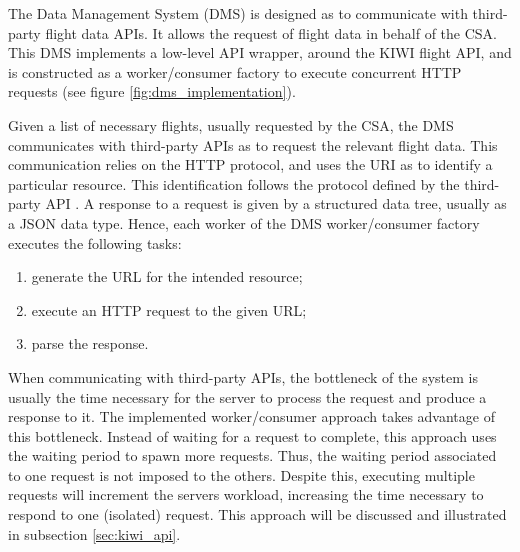 The Data Management System (DMS) is designed as to communicate with third-party flight data APIs. It allows the request of flight data in behalf of the CSA. This DMS implements a low-level API wrapper, around the KIWI flight API, and is constructed as a worker/consumer factory to execute concurrent HTTP requests (see figure \ref{fig:dms_implementation}). 


Given a list of necessary flights, usually requested by the CSA, the DMS communicates with third-party APIs as to request the relevant flight data. This communication relies on the HTTP protocol, and uses the URI as to identify a particular resource. This identification follows the protocol defined by the third-party API \cite{kiwi_api}. A response to a request is given by a structured data tree, usually as a JSON data type. Hence, each worker of the DMS worker/consumer factory executes the following tasks:
\begin{enumerate}
  \item generate the URL for the intended resource;
  \item execute an HTTP request to the given URL;
  \item parse the response.
\end{enumerate}

When communicating with third-party APIs, the bottleneck of the system is usually the time necessary for the server to process the request and produce a response to it. The implemented worker/consumer approach takes advantage of this bottleneck. Instead of waiting for a request to complete, this approach uses the waiting period to spawn more requests. Thus, the waiting period associated to one request is not imposed to the others. Despite this, executing multiple requests will increment the servers workload, increasing the time necessary to respond to one (isolated) request. This approach will be discussed and illustrated in subsection \ref{sec:kiwi_api}.


